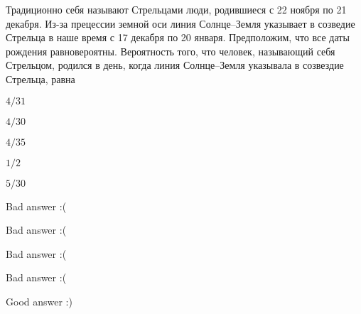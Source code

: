 
\begin{question}
Традиционно себя называют Стрельцами люди, родившиеся с 22 ноября по 21
декабря. Из-за прецессии земной оси линия Солнце--Земля указывает в
созведие Стрельца в наше время с 17 декабря по 20 января. Предположим,
что все даты рождения равновероятны. Вероятность того, что человек,
называющий себя Стрельцом, родился в день, когда линия Солнце--Земля
указывала в созвездие Стрельца, равна
\begin{answerlist}
  \item \(4/31\)
  \item \(4/30\)
  \item \(4/35\)
  \item \(1/2\)
  \item \(5/30\)
\end{answerlist}
\end{question}

\begin{solution}
\begin{answerlist}
  \item Bad answer :(
  \item Bad answer :(
  \item Bad answer :(
  \item Bad answer :(
  \item Good answer :)
\end{answerlist}
\end{solution}


